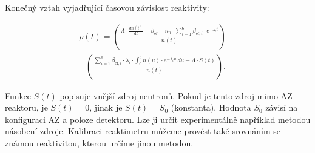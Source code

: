 Konečný vztah vyjadřující časovou závislost reaktivity:

\begin{equation}
    \boxed{
  \begin{multlined}
    \rho(t) = \left( \frac{\Lambda \cdot \frac{dn(t)}{\text{d}t} + \beta_{\text{ef}} - n_0 \cdot \sum_{i=1}^6 \beta_{\text{ef}, i} \cdot e^{-\lambda_i t}}{n(t)} \right) -\\
    - \left( \frac{\sum_{i=1}^6 \beta_{\text{ef}, i} \cdot \lambda_i \cdot \int_0^t n(u) \cdot e^{-\lambda_i u} \, du - \Lambda \cdot S(t)}{n(t)} \right).
\end{multlined}}
\end{equation}

Funkce $ S(t) $ popisuje vnější zdroj neutronů. Pokud je tento zdroj mimo AZ reaktoru, je $ S(t) = 0 $, jinak je $ S(t) = S_0 $ (konstanta). Hodnota $ S_0 $ závisí na konfiguraci AZ a poloze detektoru. Lze ji určit experimentálně například metodou násobení zdroje. Kalibraci reaktimetru můžeme provést také srovnáním se známou reaktivitou, kterou určíme jinou metodou.

